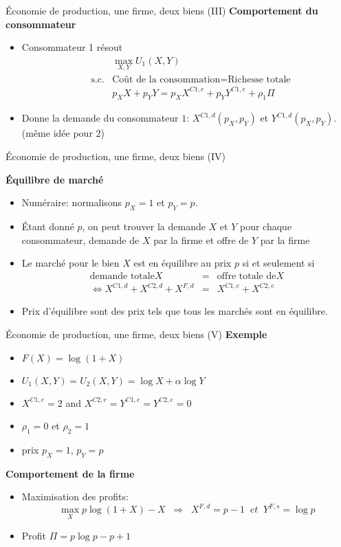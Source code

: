 \documentclass[handout]{beamer}
\newenvironment{iPar}[1]{\textbf{#1} \begin{itemize}}{\end{itemize}}
\newcommand{\mdp}{\medskip \pause}
\begin{document}
\begin{frame}{Économie de production, une firme, deux biens (III)}
\begin{iPar}{Comportement du consommateur} \item Consommateur 1 résout
\begin{eqnarray*} &&\max_{X,Y} U_1(X,Y) \\ &\textrm{s.c.} &\textrm{Coût de la consommation} = \textrm{Richesse totale} \\ &&  p_{X} X +  p_{Y}Y = p_{X}
X^{C1,e}+ p_{Y}Y^{C1,e} + \rho_{1}\Pi\end{eqnarray*} \item Donne la demande du consommateur  $1$:  $X^{C1,d}(p_X,p_Y)$ et
$Y^{C1,d}(p_X,p_Y)$. (même idée pour 2) \end{iPar} \end{frame}



\begin{frame}{Économie de production, une firme, deux biens (IV)}

\begin{iPar}{Équilibre de marché} \item Numéraire: normalisons
$p_{X} = 1$ et $p_{Y} = p$. \item Étant donné $p$, on peut trouver la demande $X$
et $Y$ pour chaque consommateur, demande de $X$ par la firme et offre de $Y$
par la firme

\item Le marché pour le bien $X$  est en équilibre au prix $p$
si et seulement si \begin{eqnarray*}  \textrm{demande totale} X &=&
\textrm{offre totale de} X  \\ \iff X^{C1,d} + X^{C2,d} + X^{F,d} &=&
X^{C1,e} + X^{C2,e}  \end{eqnarray*} \item Prix d'équilibre
sont des prix tels que tous les marchés sont en équilibre. \end{iPar}
\end{frame}

\begin{frame}{Économie de production, une firme, deux biens (V)}
\begin{iPar}{Exemple} \item  $F(X) =  \log(1+X)$ \item $U_1(X,Y) =
U_2(X,Y) = \log X + \alpha \log Y$ \item $X^{C1,e} = 2$ and $X^{C2,e} =
Y^{C1,e} = Y^{C2,e} = 0$ \item $\rho_1 =0 $ et $\rho_2 = 1$ \item prix
$p_X = 1$, $p_Y = p$ \end{iPar} \mdp \begin{iPar}{Comportement de la firme} \item
Maximisation des profits: $$\max_X p\log(1+X) - X\;\; \Rightarrow \;\; X^{F,d}
= p- 1 \;\; et \;\; Y^{F,s} = \log p$$ \item Profit $\Pi = p \log p - p
+1 $\end{iPar}

\end{frame}
\end{document}
